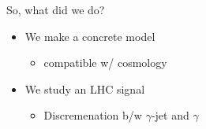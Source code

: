 \documentclass[17pt,ignorenonframetext,]{beamer}
\providecommand{\tightlist}{%
  \setlength{\itemsep}{0pt}\setlength{\parskip}{0pt}}
\begin{document}
\begin{frame}{So, what did we do?}

\begin{itemize}
\tightlist
\item
  We make a concrete model

  \begin{itemize}
  \tightlist
  \item
    compatible w/ cosmology
  \end{itemize}
\item
  We study an LHC signal

  \begin{itemize}
  \tightlist
  \item
    Discremenation b/w \(\gamma\)-jet and \(\gamma\)
  \end{itemize}
\end{itemize}

\end{frame}
\end{document}
